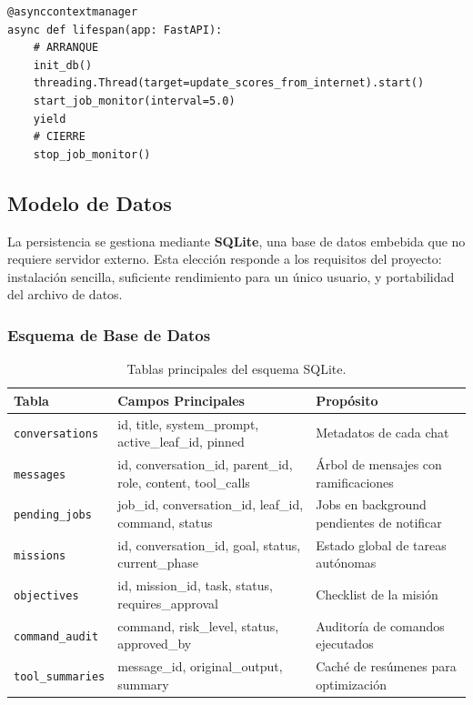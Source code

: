 \begin{verbatim}
@asynccontextmanager
async def lifespan(app: FastAPI):
    # ARRANQUE
    init_db()
    threading.Thread(target=update_scores_from_internet).start()
    start_job_monitor(interval=5.0)
    yield
    # CIERRE
    stop_job_monitor()
\end{verbatim}

\subsection{Modelo de Datos}

La persistencia se gestiona mediante \textbf{SQLite}, una base de datos embebida que no requiere servidor externo. Esta elección responde a los requisitos del proyecto: instalación sencilla, suficiente rendimiento para un único usuario, y portabilidad del archivo de datos.

\subsubsection{Esquema de Base de Datos}

\begin{table}[H]
\centering
\renewcommand{\arraystretch}{1.1}
\small
\begin{tabular}{|l|p{4cm}|p{6cm}|}
\hline
\rowcolor[gray]{0.85}
\textbf{Tabla} & \textbf{Campos Principales} & \textbf{Propósito} \\
\hline
\texttt{conversations} & id, title, system\_prompt, active\_leaf\_id, pinned & Metadatos de cada chat \\
\hline
\texttt{messages} & id, conversation\_id, parent\_id, role, content, tool\_calls & Árbol de mensajes con ramificaciones \\
\hline
\texttt{pending\_jobs} & job\_id, conversation\_id, leaf\_id, command, status & Jobs en background pendientes de notificar \\
\hline
\texttt{missions} & id, conversation\_id, goal, status, current\_phase & Estado global de tareas autónomas \\
\hline
\texttt{objectives} & id, mission\_id, task, status, requires\_approval & Checklist de la misión \\
\hline
\texttt{command\_audit} & command, risk\_level, status, approved\_by & Auditoría de comandos ejecutados \\
\hline
\texttt{tool\_summaries} & message\_id, original\_output, summary & Caché de resúmenes para optimización \\
\hline
\end{tabular}
\caption{Tablas principales del esquema SQLite.}
\label{tab:esquema_sqlite}
\end{table}

